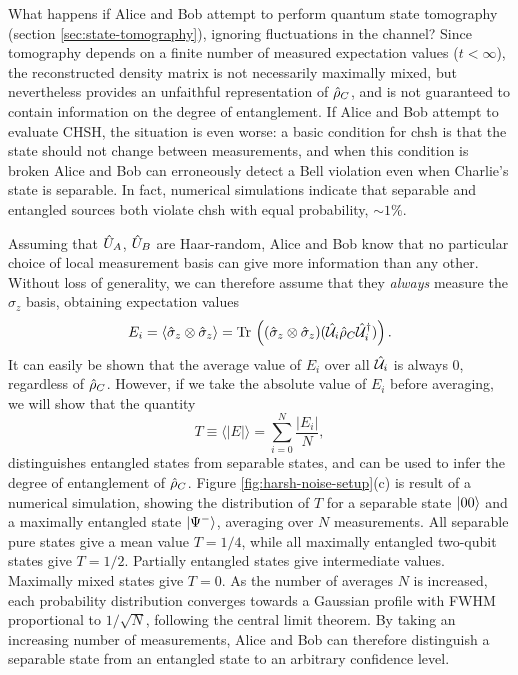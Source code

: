 What happens if Alice and Bob attempt to perform quantum state tomography (section \ref{sec:state-tomography}), ignoring fluctuations in the channel? Since tomography depends on a finite number of measured expectation values ($t<\infty$), the reconstructed density matrix is not necessarily maximally mixed, but nevertheless provides an unfaithful representation of $\hat{\rho}_C$, and is not guaranteed to contain information on the degree of entanglement. If Alice and Bob attempt to evaluate CHSH, the situation is even worse: a basic condition for \gls{chsh} is that the state should not change between measurements, and when this condition is broken Alice and Bob can erroneously detect a Bell violation even when Charlie's state is separable. In fact, numerical simulations indicate that separable and entangled sources both violate \gls{chsh} with equal probability, $\sim1\%$. 

Assuming that $\hat{U}_A$, $\hat{U}_B$ are Haar-random, Alice and Bob know that no particular choice of local measurement basis can give more information than any other. Without loss of generality, we can therefore assume that they \emph{always} measure the $\hat{\sigma}_z$ basis, obtaining expectation values
\begin{equation}
    E_i = \langle \hat{\sigma}_z \otimes \hat{\sigma}_z \rangle = \text{Tr}\, \left( (\hat{\sigma}_z \otimes \hat{\sigma}_z ) (\hat{\mathcal{U}}_i \hat{\rho}_C \hat{\mathcal{U}}_i^\dagger ) \right).
    \label{eqn:harsh-expectation-value}
\end{equation}
It can easily be shown that the average value of $E_i$ over all $\hat{\mathcal{U}}_i$ is always 0, regardless of $\hat{\rho}_C$. However, if we take the absolute value of $E_i$ before averaging, we will show that the quantity
\begin{equation}
    T \equiv \langle |E| \rangle = \sum_{i=0}^N \frac{|E_i|}{N},
    \label{eqn:define-t}
\end{equation}
distinguishes entangled states from separable states, and can be used to infer the degree of entanglement of $\hat{\rho}_C$.  Figure \ref{fig:harsh-noise-setup}(c) is result of a numerical simulation, showing the distribution of $T$ for a separable state $\mbox{$ | 00 \rangle $}$ and a maximally entangled state $\mbox{$ | \Psi^- \rangle $}$, averaging over $N$ measurements. 
All separable pure states give a mean value $T=1/4$, while all maximally entangled two-qubit states give $T=1/2$. Partially entangled states give intermediate values. Maximally mixed states give $T=0$.  As the number of averages $N$ is increased, each probability distribution converges towards a Gaussian profile with FWHM proportional to $1/\sqrt{N}$, following the central limit theorem. By taking an increasing number of measurements, Alice and Bob can therefore distinguish a separable state from an entangled state to an arbitrary confidence level.

